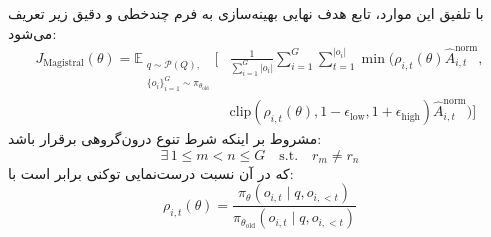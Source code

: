 با تلفیق این موارد، تابع هدف نهایی بهینه‌سازی به فرم چندخطی و دقیق زیر تعریف می‌شود:
\begin{equation}
\begin{aligned}
    J_{\text{Magistral}}(\theta) = \mathbb{E}_{\substack{q \sim \mathcal{P}(Q), \\ \{o_i\}_{i=1}^G \sim \pi_{\theta_{\text{old}}}}} \Bigg[ & \frac{1}{\sum_{i=1}^G |o_i|} \sum_{i=1}^G \sum_{t=1}^{|o_i|} \min \Big( \rho_{i,t}(\theta) \hat{A}^{\text{norm}}_{i,t}, \\
    & \text{clip}\left(\rho_{i,t}(\theta), 1 - \epsilon_{\text{low}}, 1 + \epsilon_{\text{high}}\right) \hat{A}^{\text{norm}}_{i,t} \Big) \Bigg]
\end{aligned}
\end{equation}
مشروط بر اینکه شرط تنوع درون‌گروهی برقرار باشد:
\begin{equation}
    \exists \, 1 \le m < n \le G \quad \text{s.t.} \quad r_m \neq r_n
\end{equation}
که در آن نسبت درست‌نمایی توکنی برابر است با:
\begin{equation}
    \rho_{i,t}(\theta) = \frac{\pi_\theta(o_{i,t} \mid q, o_{i,<t})}{\pi_{\theta_{\text{old}}}(o_{i,t} \mid q, o_{i,<t})}
\end{equation}

